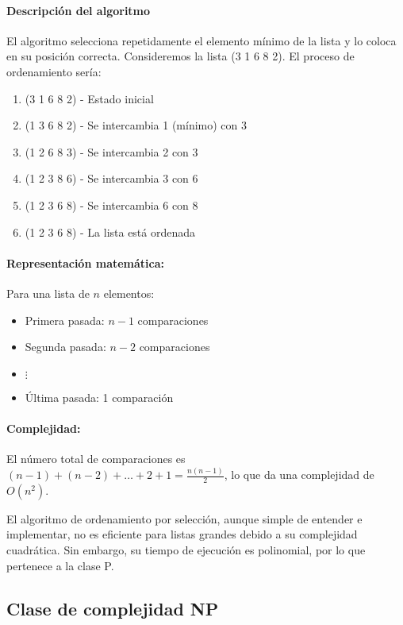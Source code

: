 \documentclass[12pt,titlepage,twoside,openright]{book}
\begin{document}
\paragraph{Descripci\'on del algoritmo}
El algoritmo selecciona repetidamente el elemento m\'inimo de la lista y lo coloca en su posici\'on correcta. Consideremos la lista (3 1 6 8 2). El proceso de ordenamiento ser\'ia:

\begin{enumerate}
	\item (3 1 6 8 2) - Estado inicial
	\item (1 3 6 8 2) - Se intercambia 1 (m\'inimo) con 3
	\item (1 2 6 8 3) - Se intercambia 2 con 3
	\item (1 2 3 8 6) - Se intercambia 3 con 6
	\item (1 2 3 6 8) - Se intercambia 6 con 8
	\item (1 2 3 6 8) - La lista est\'a ordenada
\end{enumerate}

\paragraph{Representaci\'on matem\'atica:}
Para una lista de $n$ elementos:
\begin{itemize}
	\item Primera pasada: $n-1$ comparaciones
	\item Segunda pasada: $n-2$ comparaciones
	\item $\vdots$
	\item \'Ultima pasada: 1 comparaci\'on
\end{itemize}

\paragraph{Complejidad:}
El n\'umero total de comparaciones es $(n-1) + (n-2) + \dots + 2 + 1 = \frac{n(n-1)}{2}$, lo que da una complejidad de $O(n^2)$.

El algoritmo de ordenamiento por selecci\'on, aunque simple de entender e implementar, no es eficiente para listas grandes debido a su complejidad cuadr\'atica. Sin embargo, su tiempo de ejecuci\'on es polinomial, por lo que pertenece a la clase P.

\subsection{Clase de complejidad NP}
\end{document}
